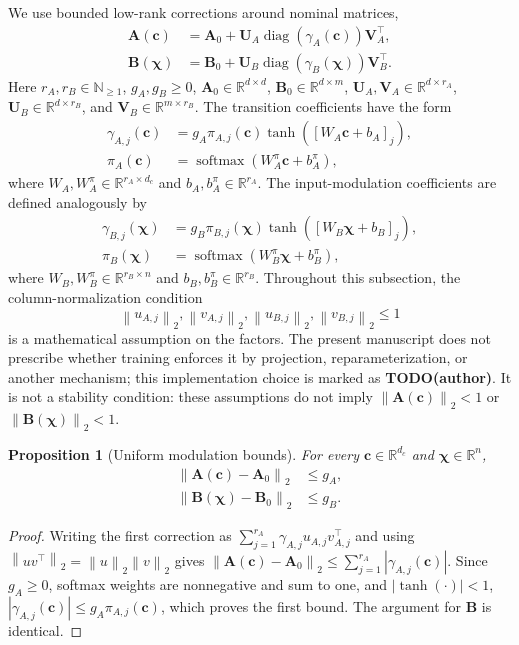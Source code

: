 \documentclass[journal]{IEEEtran}
\newtheorem{proposition}{Proposition}
\newcommand{\vc}{\mathbf{c}}
\newcommand{\vchi}{\boldsymbol{\chi}}
\newcommand{\mA}{\mathbf{A}}
\newcommand{\mB}{\mathbf{B}}
\newcommand{\mU}{\mathbf{U}}
\newcommand{\mV}{\mathbf{V}}
\newcommand{\R}{\mathbb{R}}
\newcommand{\norm}[1]{\left\lVert #1\right\rVert}
\begin{document}
We use bounded low-rank corrections around nominal matrices,
\begin{align}
    \mA(\vc)&=\mA_0+\mU_A\operatorname{diag}(\gamma_A(\vc))\mV_A^\top,
    \label{eq:transition_schedule}\\
    \mB(\vchi)&=\mB_0+\mU_B\operatorname{diag}(\gamma_B(\vchi))\mV_B^\top.
    \label{eq:low_rank_schedules}
\end{align}
Here $r_A,r_B\in\mathbb N_{\ge1}$, $g_A,g_B\ge0$, $\mA_0\in\R^{d\times d}$, $\mB_0\in\R^{d\times m}$, $\mU_A,\mV_A\in\R^{d\times r_A}$, $\mU_B\in\R^{d\times r_B}$, and $\mV_B\in\R^{m\times r_B}$. The transition coefficients have the form
\begin{align}
    \gamma_{A,j}(\vc)&=g_A\pi_{A,j}(\vc)\tanh([W_A\vc+b_A]_j),
    \label{eq:A_modulation_coefficients}\\
    \pi_A(\vc)&=\operatorname{softmax}(W_A^\pi\vc+b_A^\pi),
    \label{eq:A_modulation}
\end{align}
where $W_A,W_A^\pi\in\R^{r_A\times d_c}$ and $b_A,b_A^\pi\in\R^{r_A}$. The input-modulation coefficients are defined analogously by
\begin{align}
    \gamma_{B,j}(\vchi)&=g_B\pi_{B,j}(\vchi)\tanh([W_B\vchi+b_B]_j),\\
    \pi_B(\vchi)&=\operatorname{softmax}(W_B^\pi\vchi+b_B^\pi),
\end{align}
where $W_B,W_B^\pi\in\R^{r_B\times n}$ and $b_B,b_B^\pi\in\R^{r_B}$. Throughout this subsection, the column-normalization condition
\begin{equation}
 \norm{u_{A,j}}_2,\norm{v_{A,j}}_2,\norm{u_{B,j}}_2,\norm{v_{B,j}}_2\le1
 \label{eq:factor_norm_assumption}
\end{equation}
is a mathematical assumption on the factors. The present manuscript does not prescribe whether training enforces it by projection, reparameterization, or another mechanism; this implementation choice is marked as \textbf{TODO(author)}. It is not a stability condition: these assumptions do not imply $\norm{\mA(\vc)}_2<1$ or $\norm{\mB(\vchi)}_2<1$.

\begin{proposition}[Uniform modulation bounds]
\label{prop:modulation_bound}
For every $\vc\in\R^{d_c}$ and $\vchi\in\R^n$,
\begin{equation}
    \begin{aligned}
    \norm{\mA(\vc)-\mA_0}_2&\le g_A,\\
    \norm{\mB(\vchi)-\mB_0}_2&\le g_B.
    \end{aligned}
    \label{eq:modulation_bound}
\end{equation}
\end{proposition}
\begin{proof}
Writing the first correction as $\sum_{j=1}^{r_A}\gamma_{A,j}u_{A,j}v_{A,j}^{\top}$ and using $\norm{uv^{\top}}_2=\norm u_2\norm v_2$ gives $\norm{\mA(\vc)-\mA_0}_2\le\sum_{j=1}^{r_A}|\gamma_{A,j}(\vc)|$. Since $g_A\ge0$, softmax weights are nonnegative and sum to one, and $|\tanh(\cdot)|<1$, $|\gamma_{A,j}(\vc)|\le g_A\pi_{A,j}(\vc)$, which proves the first bound. The argument for $\mB$ is identical.
\end{proof}
\end{document}
